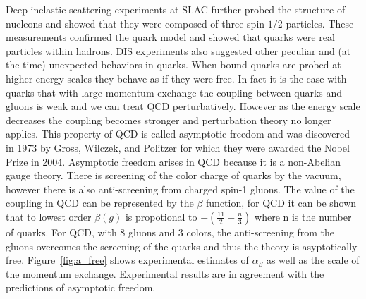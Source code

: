 Deep inelastic scattering experiments at SLAC further probed the structure of nucleons and showed that they were composed of three spin-$1/2$ particles. These measurements confirmed the quark model and showed that quarks were real particles within hadrons. DIS experiments also suggested other peculiar and (at the time) unexpected behaviors in quarks. When bound quarks are probed at higher energy scales they behave as if they were free. In fact it is the case with quarks that with large momentum exchange the coupling between quarks and gluons is weak and we can treat QCD perturbatively. However as the energy scale decreases the coupling becomes stronger and perturbation theory no longer applies. This property of QCD is called asymptotic freedom and was discovered in 1973 by Gross, Wilczek, and Politzer for which they were awarded the Nobel Prize in 2004. Asymptotic freedom arises in QCD because it is a non-Abelian gauge theory. There is screening of the color charge of quarks by the vacuum, however there is also anti-screening from charged spin-1 gluons. The value of the coupling in QCD can be represented by the $\beta$ function, for QCD it can be shown that to lowest order $\beta(g)$ is propotional to $-(\frac{11}{2} - \frac{n}{3})$ where n is the number of quarks. For QCD, with 8 gluons and 3 colors, the anti-screening from the gluons overcomes the screening of the quarks and thus the theory is asyptotically free. Figure~\ref{fig:a_free} shows experimental estimates of $\alpha_S$ as well as the scale of the momentum exchange. Experimental results are in agreement with the predictions of asymptotic freedom. 

